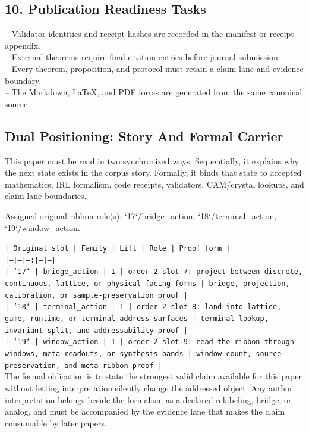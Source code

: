 \documentclass[11pt]{article}
\begin{document}
\subsection*{10. Publication Readiness Tasks}

\noindent{}-- Validator identities and receipt hashes are recorded in the manifest or receipt appendix.\\
\noindent{}-- External theorems require final citation entries before journal submission.\\
\noindent{}-- Every theorem, proposition, and protocol must retain a claim lane and evidence boundary.\\
\noindent{}-- The Markdown, LaTeX, and PDF forms are generated from the same canonical source.\\

\subsection*{Dual Positioning: Story And Formal Carrier}

This paper must be read in two synchronized ways. Sequentially, it explains why
the next state exists in the corpus story. Formally, it binds that state to
accepted mathematics, IRL formalism, code receipts, validators, CAM/crystal
lookups, and claim-lane boundaries.

Assigned original ribbon role(s): `17`/bridge\_action, `18`/terminal\_action, `19`/window\_action.

\noindent\texttt{| Original slot | Family | Lift | Role | Proof form |}\\
\noindent\texttt{|---|---|---:|---|---|}\\
\noindent\texttt{| `17` | bridge\_action | 1 | order-2 slot-7: project between discrete, continuous, lattice, or physical-facing forms | bridge, projection, calibration, or sample-preservation proof |}\\
\noindent\texttt{| `18` | terminal\_action | 1 | order-2 slot-8: land into lattice, game, runtime, or terminal address surfaces | terminal lookup, invariant split, and addressability proof |}\\
\noindent\texttt{| `19` | window\_action | 1 | order-2 slot-9: read the ribbon through windows, meta-readouts, or synthesis bands | window count, source preservation, and meta-ribbon proof |}\\

The formal obligation is to state the strongest valid claim available for this
paper without letting interpretation silently change the addressed object. Any
author interpretation belongs beside the formalism as a declared relabeling,
bridge, or analog, and must be accompanied by the evidence lane that makes the
claim consumable by later papers.
\end{document}
